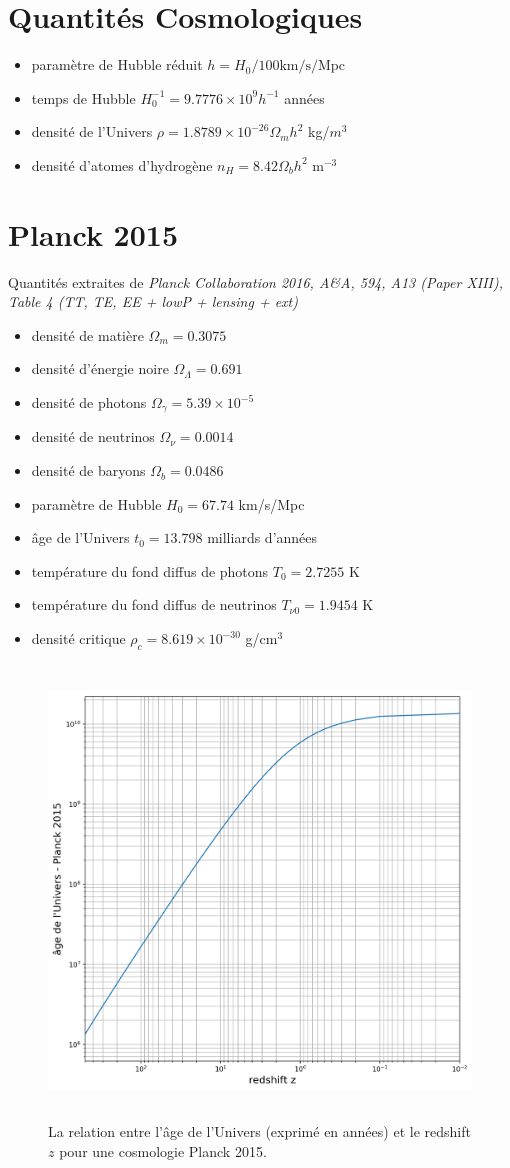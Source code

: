 \section{Quantités Cosmologiques}
\begin{itemize}
\item paramètre de Hubble réduit $h=H_0/100\mathrm{km/s/Mpc}$
\item temps de Hubble $H_0^{-1}=9.7776 \times 10^9 h^{-1}$ années
\item densité de l'Univers $\rho=1.8789\times 10^{-26} \Omega_m h^2$ kg/$m^3$
\item densité d'atomes d'hydrogène $n_H=8.42\Omega_b h^2$ m$^{-3}$
\end{itemize}


\section{Planck 2015}
Quantités extraites de \textit{Planck Collaboration 2016, A&A, 594, A13 (Paper XIII), Table 4 (TT, TE, EE + lowP + lensing + ext)}
\begin{itemize}
\item densité de matière $\Omega_m=0.3075$
\item densité d'énergie noire $\Omega_\Lambda = 0.691$
\item densité de photons $\Omega_\gamma = 5.39 \times 10^{-5}$
\item densité de neutrinos $\Omega_\nu = 0.0014$
\item densité de baryons $\Omega_b=0.0486$
\item paramètre de Hubble $H_0=67.74$ km/s/Mpc
\item âge de l'Univers $t_0=13.798$ milliards d'années
\item température du fond diffus de photons $T_0=2.7255$ K
\item température du fond diffus de neutrinos $T_{\nu0}=1.9454$ K
\item densité critique $\rho_c=8.619\times 10^{-30}$ g/cm$^3$
\end{itemize}

\begin{figure}[htbp]
	\centering
		\includegraphics[height=12cm]{figs/zage.png}
	\caption[La relation redshift-age pour une cosmologie Planck 2015]{La relation entre l'âge de l'Univers (exprimé en années) et le redshift $z$ pour une cosmologie Planck 2015.}
	\label{f:zage}
\end{figure}


